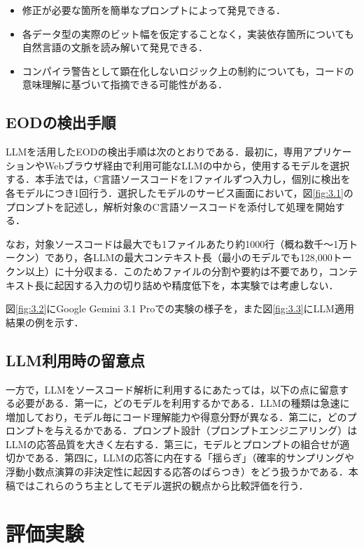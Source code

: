 \documentclass[submit,techrep,noauthor]{ipsj}
\begin{document}
\begin{itemize}
	\item 修正が必要な箇所を簡単なプロンプトによって発見できる．
	\item 各データ型の実際のビット幅を仮定することなく，実装依存箇所についても自然言語の文脈を読み解いて発見できる．
	\item コンパイラ警告として顕在化しないロジック上の制約についても，コードの意味理解に基づいて指摘できる可能性がある．
\end{itemize}

\subsection{EODの検出手順}

LLMを活用したEODの検出手順は次のとおりである．最初に，専用アプリケーションやWebブラウザ経由で利用可能なLLMの中から，使用するモデルを選択する．本手法では，C言語ソースコードを1ファイルずつ入力し，個別に検出を各モデルにつき1回行う．選択したモデルのサービス画面において，図\ref{fig:3.1}のプロンプトを記述し，解析対象のC言語ソースコードを添付して処理を開始する．

なお，対象ソースコードは最大でも1ファイルあたり約1000行（概ね数千～1万トークン）であり，各LLMの最大コンテキスト長（最小のモデルでも128,000トークン以上）に十分収まる．このためファイルの分割や要約は不要であり，コンテキスト長に起因する入力の切り詰めや精度低下を，本実験では考慮しない．

図\ref{fig:3.2}にGoogle Gemini 3.1 Proでの実験の様子を，また図\ref{fig:3.3}にLLM適用結果の例を示す．

\subsection{LLM利用時の留意点}
\label{sec:LLM利用時の留意点}

一方で，LLMをソースコード解析に利用するにあたっては，以下の点に留意する必要がある．第一に，どのモデルを利用するかである．LLMの種類は急速に増加しており，モデル毎にコード理解能力や得意分野が異なる．第二に，どのプロンプトを与えるかである．プロンプト設計（プロンプトエンジニアリング）はLLMの応答品質を大きく左右する\cite{ref6}．第三に，モデルとプロンプトの組合せが適切かである．第四に，LLMの応答に内在する「揺らぎ」（確率的サンプリングや浮動小数点演算の非決定性に起因する応答のばらつき）をどう扱うかである\cite{ref7}．本稿ではこれらのうち主としてモデル選択の観点から比較評価を行う．

\section{評価実験}
\end{document}
